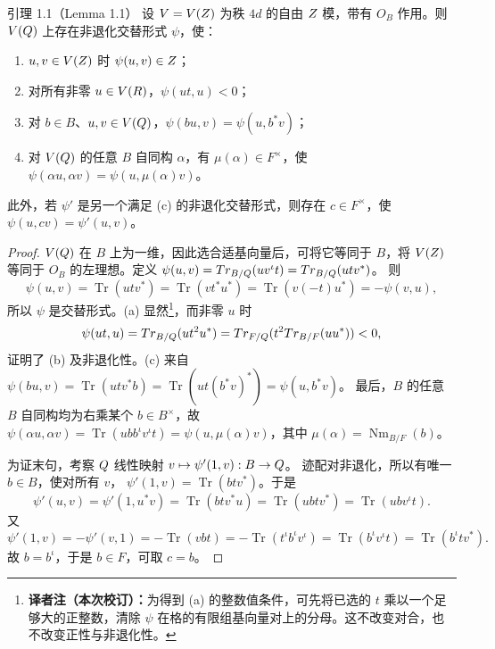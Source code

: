 \begin{originaltheorem}{引理 1.1（Lemma 1.1）}
设 $V=V(Z)$ 为秩 $4d$ 的自由 $Z$ 模，带有 $O_B$ 作用。则
$V(Q)$ 上存在非退化交替形式 $\psi$，使：
\begin{enumerate}
\item[(a)] $u,v\in V(Z)$ 时 $\psi(u,v)\in Z$；
\item[(b)] 对所有非零 $u\in V(R)$，$\psi(ut,u)<0$；
\item[(c)] 对 $b\in B$、$u,v\in V(Q)$，$\psi(bu,v)=\psi(u,b^*v)$；
\item[(d)] 对 $V(Q)$ 的任意 $B$ 自同构 $\alpha$，有 $\mu(\alpha)\in F^\times$，使
$\psi(\alpha u,\alpha v)=\psi(u,\mu(\alpha)v)$。
\end{enumerate}
此外，若 $\psi'$ 是另一个满足 (c) 的非退化交替形式，则存在
$c\in F^\times$，使 $\psi(u,cv)=\psi'(u,v)$。
\end{originaltheorem}
\begin{proof}
$V(Q)$ 在 $B$ 上为一维，因此选合适基向量后，可将它等同于 $B$，将
$V(Z)$ 等同于 $O_B$ 的左理想。定义
$\psi(u,v)=Tr_{B/Q}(uv^\iota t)=Tr_{B/Q}(utv^*)$。
则
\[
\psi(u,v)=\operatorname{Tr}(utv^*)=\operatorname{Tr}(vt^*u^*)
=\operatorname{Tr}(v(-t)u^*)=-\psi(v,u),
\]
所以 $\psi$ 是交替形式。(a) 显然\footnote{\textbf{译者注（本次校订）：}为得到 (a) 的整数值条件，可先将已选的 $t$ 乘以一个足够大的正整数，清除 $\psi$ 在格的有限组基向量对上的分母。这不改变对合，也不改变正性与非退化性。}，而非零 $u$ 时
\[
\psi(ut,u)=Tr_{B/Q}(ut^2u^*)
=Tr_{F/Q}(t^2Tr_{B/F}(uu^*))<0,
\]
证明了 (b) 及非退化性。(c) 来自
$\psi(bu,v)=\operatorname{Tr}(utv^*b)=\operatorname{Tr}(ut(b^*v)^*)=\psi(u,b^*v)$。
最后，$B$ 的任意 $B$ 自同构均为右乘某个 $b\in B^\times$，故
$\psi(\alpha u,\alpha v)=\operatorname{Tr}(ubb^\iota v^\iota t)
=\psi(u,\mu(\alpha)v)$，其中 $\mu(\alpha)=\operatorname{Nm}_{B/F}(b)$。

为证末句，考察 $Q$ 线性映射 $v\mapsto\psi'(1,v):B\to Q$。
迹配对非退化，所以有唯一 $b\in B$，使对所有 $v$，
$\psi'(1,v)=\operatorname{Tr}(btv^*)$。于是
\[
\psi'(u,v)=\psi'(1,u^*v)=\operatorname{Tr}(btv^*u)
=\operatorname{Tr}(ubtv^*)=\operatorname{Tr}(ubv^\iota t).
\]
又
\[
\psi'(1,v)=-\psi'(v,1)=-\operatorname{Tr}(vbt)
=-\operatorname{Tr}(t^\iota b^\iota v^\iota)
=\operatorname{Tr}(b^\iota v^\iota t)=\operatorname{Tr}(b^\iota tv^*).
\]
故 $b=b^\iota$，于是 $b\in F$，可取 $c=b$。
\end{proof}

